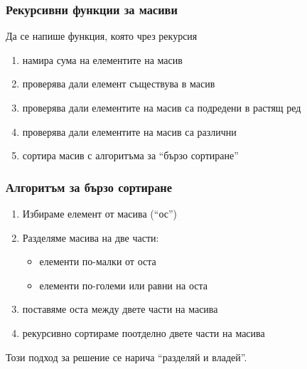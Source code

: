 \documentclass{beamer}
\begin{document}

\begin{frame}
  \frametitle{Рекурсивни функции за масиви}

  Да се напише функция, която чрез рекурсия
  \begin{enumerate}[<+->]
  \item намира сума на елементите на масив
  \item проверява дали елемент съществува в масив
  \item проверява дали елементите на масив са подредени в растящ ред
  \item проверява дали елементите на масив са различни
  \item сортира масив с алгоритъма за ``бързо сортиране''
  \end{enumerate}
\end{frame}

\begin{frame}
  \frametitle{Алгоритъм за бързо сортиране}

  \begin{enumerate}[<+->]
  \item Избираме елемент от масива (``ос'')
  \item Разделяме масива на две части:
    \begin{itemize}
    \item елементи по-малки от оста
    \item елементи по-големи или равни на оста
    \end{itemize}
  \item поставяме оста между двете части на масива
  \item \alert{рекурсивно} сортираме поотделно двете части на масива
  \end{enumerate}
  \onslide<+->
  Този подход за решение се нарича ``разделяй и владей''.
\end{frame}
\end{document}

